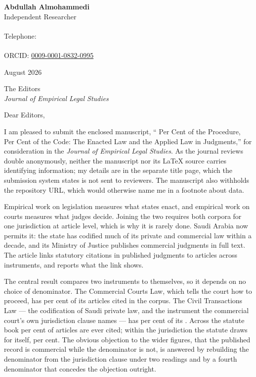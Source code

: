 \documentclass[10.5pt]{letter}
\begin{document}
\noindent
{\large\textbf{Abdullah Almohammedi}}\\
Independent Researcher\\
\ContactAddress\\
Telephone: \ContactPhone\\
\texttt{\ContactEmail}\\
ORCID: \href{https://orcid.org/0009-0001-0832-0995}{0009-0001-0832-0995}

\vspace{0.8em}
 August 2026

\vspace{0.8em}
\noindent The Editors\\
\emph{Journal of Empirical Legal Studies}

\vspace{0.9em}
\noindent Dear Editors,

\vspace{0.6em}
I am pleased to submit the enclosed manuscript, ``\nCCLShareRound{} Per Cent
of the Procedure, \nCivilShareRound{} Per Cent of the Code: The Enacted Law
and the Applied Law in \nJudgments{} Judgments,'' for consideration in the
\emph{Journal of Empirical Legal Studies}. As the journal reviews double
anonymously, neither the manuscript nor its \LaTeX{} source carries
identifying information; my details are in the separate title page, which the
submission system states is not sent to reviewers. The manuscript also
withholds the repository URL, which would otherwise name me in a footnote
about data.

\vspace{0.5em}
Empirical work on legislation measures what states enact, and empirical work
on courts measures what judges decide. Joining the two requires both corpora
for one jurisdiction at article level, which is why it is rarely done. Saudi
Arabia now permits it: the state has codified much of its private and
commercial law within a decade, and its Ministry of Justice publishes
commercial judgments in full text. The article links \nCitations{} statutory
citations in \nJudgments{} published judgments to \nRegistryArticles{}
articles across \nInstruments{} instruments, and reports what the link shows.

\vspace{0.5em}
The central result compares two instruments to themselves, so it depends on
no choice of denominator. The Commercial Courts Law, which tells the court
how to proceed, has \nCCLShare{} per cent of its articles cited in the
corpus. The Civil Transactions Law --- the codification of Saudi private law,
and the instrument the commercial court's own jurisdiction clause names ---
has \nCivilShare{} per cent of its \nCivilArticles{}. Across the statute book
\nArticlesCitedShare{} per cent of articles are ever cited; within the
jurisdiction the statute draws for itself, \nScopeNarrowShare{} per cent. The obvious objection to the wider figures, that the published record
is commercial while the denominator is not, is answered by rebuilding the
denominator from the jurisdiction clause under two readings and by a fourth
denominator that concedes the objection outright.
\end{document}
